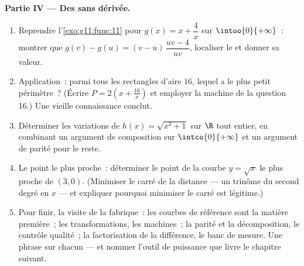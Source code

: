 \begin{problem}
\medskip
\noindent\textbf{Partie IV --- Des  sans dérivée.}
\begin{enumerate}[resume]
  \item Reprendre l'\cref{exo:g11:func:11} pour
        $g(x) = x + \dfrac4x$ sur $\intoo{0}{+\infty}$~: montrer que
        $g(v) - g(u) = (v - u)\,\dfrac{uv - 4}{uv}$, localiser le
         et donner sa valeur.
  \item Application~: parmi tous les rectangles d'aire $16$, lequel
        a le plus petit périmètre~? (Écrire $P = 2\left(x +
        \frac{16}{x}\right)$ et employer la machine de la question
        16.) Une vieille connaissance conclut.
  \item Déterminer les variations de $h(x) = \sqrt{x^2 + 1}$ sur
        $\R$ tout entier, en combinant un argument de composition
        sur $\intco{0}{+\infty}$ et un argument de parité pour le
        reste.
  \item Le point le plus proche~: déterminer le point de la courbe
        $y = \sqrt x$ le plus proche de $(3, 0)$. (Minimiser le
        carré de la distance --- un trinôme du second degré en $x$
        --- et expliquer pourquoi minimiser le carré est légitime.)
  \item Pour finir, la visite de la fabrique~: les courbes de
        référence sont la matière première~; les transformations,
        les machines~; la parité et la décomposition, le contrôle
        qualité~; la factorisation de la différence, le banc de
        mesure. Une phrase sur chacun --- et nommer l'outil de
        puissance que livre le chapitre suivant.
\end{enumerate}
\end{problem}

